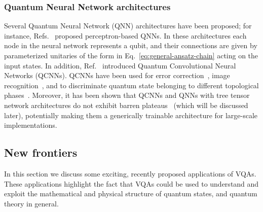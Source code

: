\documentclass[prx,twocolumn,floatfix,superscriptaddress,longbibliography]{revtex4-1}
\newcommand{\<}{\langle}
\renewcommand{\>}{\rangle}
\begin{document}
\subsubsection{ Quantum Neural Network architectures} Several Quantum Neural Network (QNN) architectures have been proposed; for instance, Refs.~\cite{altaisky2001quantum,farhi2018classification,beer2020training} proposed perceptron-based QNNs. In these architectures each node in the neural network represents a qubit, and their connections are given by parameterized unitaries of the form in Eq.~\eqref{eq:general-ansatz-chain} acting on the input states. In addition, Ref.~\cite{cong2019quantum}  introduced Quantum Convolutional Neural Networks (QCNNs).  QCNNs have been used for error correction~\cite{cong2019quantum}, image recognition~\cite{franken2020explorations}, and to discriminate quantum state belonging to different topological phases~\cite{cong2019quantum}. Moreover, it has been shown that QCNNs and QNNs with tree tensor network architectures do not exhibit barren plateaus~\cite{pesah2020absence,zhang2020toward} (which will be discussed later), potentially making them a generically trainable architecture for large-scale implementations.  



\subsection{ New frontiers}

In this section we discuss some exciting, recently proposed applications of VQAs. These applications highlight the fact that VQAs could be used to  understand and exploit the mathematical and physical structure of quantum states,  and  quantum theory in general. 

\end{document}

